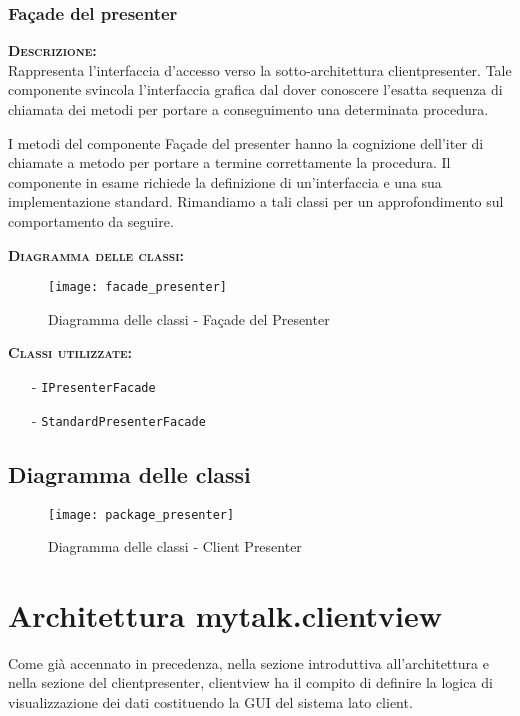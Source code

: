 \subsubsection{Façade del presenter}
\begin{description}
	\item{\scshape\bfseries Descrizione:}\\
Rappresenta l'interfaccia d'accesso verso la sotto-architettura clientpresenter. Tale componente svincola l'interfaccia grafica dal dover conoscere l'esatta sequenza di chiamata dei metodi per portare a conseguimento una determinata procedura.

I metodi del componente Façade del presenter hanno la cognizione dell'iter di chiamate a metodo per portare a termine correttamente la procedura. Il componente in esame richiede la definizione di un'interfaccia e una sua implementazione standard. Rimandiamo a tali classi per un approfondimento sul comportamento da seguire.
	\item{\scshape\bfseries Diagramma delle classi:}
	\begin{figure}[H]
\begin{center}
\texttt{[image: facade\_presenter]}
\caption{Diagramma delle classi - Façade del Presenter}\label{fig:facade_presenter}
\end{center}
\end{figure}
	\item{\scshape\bfseries Classi utilizzate:} 
	\begin{itemize}[noitemsep,nolistsep]
		\item[-] \texttt{IPresenterFacade}
		\item[-] \texttt{StandardPresenterFacade}
	\end{itemize}
\end{description}

\subsection{Diagramma delle classi}
\begin{figure}[H]
\begin{center}
\texttt{[image: package\_presenter]}
\caption{Diagramma delle classi - Client Presenter}\label{fig:package_presenter}
\end{center}
\end{figure}
\clearpage

\section{Architettura mytalk.clientview}
Come già accennato in precedenza, nella sezione introduttiva all'architettura e nella sezione del clientpresenter, clientview ha il compito di definire la logica di visualizzazione dei dati costituendo la GUI del sistema lato client.

